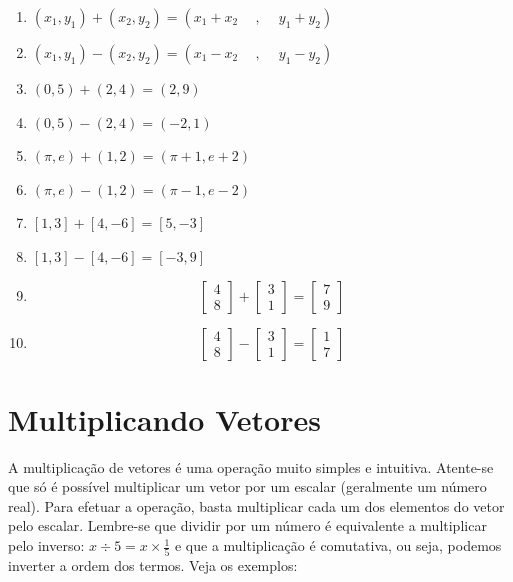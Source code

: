 \documentclass[
  portuguese,
  letterpaper,
  DIV=11,
  numbers=noendperiod]{scrreport}
\providecommand{\tightlist}{%
  \setlength{\itemsep}{0pt}\setlength{\parskip}{0pt}}
\begin{document}
\begin{enumerate}
\def\labelenumi{\arabic{enumi}.}
\tightlist
\item
  \((x_1, y_1) + (x_2, y_2) = (x_1+x_2 \phantom{-}
  , \phantom{-} y_1 + y_2)\)
\item
  \((x_1, y_1) - (x_2, y_2) = (x_1-x_2 \phantom{-}
  , \phantom{-} y_1 - y_2)\)
\item
  \((0,5)+(2,4)=(2,9)\)
\item
  \((0,5)-(2,4)=(-2,1)\)
\item
  \((\pi, e)+(1,2) = (\pi+1, e+2)\)
\item
  \((\pi, e)-(1,2) = (\pi-1, e-2)\)
\item
  \([1,3]+[4,-6]=[5,-3]\)
\item
  \([1,3]-[4,-6]=[-3,9]\)
\item
  \[
  \begin{bmatrix} 4  \\  8 \end{bmatrix}+
  \begin{bmatrix} 3  \\  1 \end{bmatrix}=
  \begin{bmatrix} 7  \\  9 \end{bmatrix}
  \]
\item
  \[
  \begin{bmatrix} 4  \\  8 \end{bmatrix}-
  \begin{bmatrix} 3  \\  1 \end{bmatrix}=
  \begin{bmatrix} 1  \\  7 \end{bmatrix}
  \]
\end{enumerate}

\section{Multiplicando Vetores}\label{multiplicando-vetores}

A multiplicação de vetores é uma operação muito simples e intuitiva.
Atente-se que só é possível multiplicar um vetor por um escalar
(geralmente um número real). Para efetuar a operação, basta multiplicar
cada um dos elementos do vetor pelo escalar. Lembre-se que dividir por
um número é equivalente a multiplicar pelo inverso:
\(x \div 5 = x \times \frac{1}{5}\) e que a multiplicação é comutativa,
ou seja, podemos inverter a ordem dos termos. Veja os exemplos:
\end{document}
